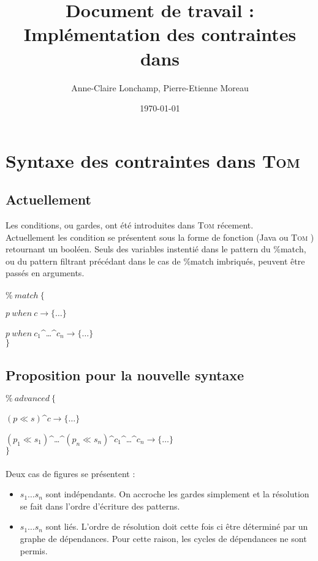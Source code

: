 \documentclass{article}
\title{Document de travail :\\ Impl\'ementation des contraintes dans \tom}
\author{Anne-Claire Lonchamp, Pierre-Etienne Moreau}
\date\today
\newcommand{\tom}{\textsc{Tom} }
\newcommand{\filter}{\ll}
\begin{document}
\maketitle

\section{Syntaxe des contraintes dans \tom}

\subsection{Actuellement}

Les conditions, ou gardes, ont \'et\'e introduites dans \tom r\'ecement.
\\

Actuellement les condition se pr\'esentent sous la forme de fonction (Java ou \tom) retournant un bool\'een.
Seuls des variables instenti\'e dans le pattern du \%match, ou du pattern filtrant pr\'ec\'edant dans le cas de \%match imbriqu\'es, peuvent \^etre pass\'es en arguments.
\\\\
$\%\:match\:\{$

$p\:when\:c\rightarrow\{\dots\}$

$p\:when\:c_1$\textasciicircum\dots\textasciicircum$ c_n\rightarrow\{\dots\}$
\\$\}$

\subsection{Proposition pour la nouvelle syntaxe}
$\%\:advanced\:\{$

$(p\filter s)$\textasciicircum$c\rightarrow\{\dots\}$

$(p_1\filter s_1)$\textasciicircum\dots\textasciicircum$(p_n\filter s_n)$\textasciicircum$c_1$\textasciicircum\dots\textasciicircum$c_n\rightarrow\{\dots\}$
\\$\}$
\\\\Deux cas de figures se pr\'esentent :
\begin{itemize}
\item $s_1\dots s_n$ sont ind\'ependants. On accroche les gardes simplement et la r\'esolution se fait dans l'ordre d'\'ecriture des patterns.
\item $s_1\dots s_n$ sont li\'es. L'ordre de r\'esolution doit cette fois ci \^etre d\'etermin\'e par un graphe de d\'ependances. Pour cette raison, les cycles de d\'ependances ne sont permis.
\end{itemize}
\end{document}
